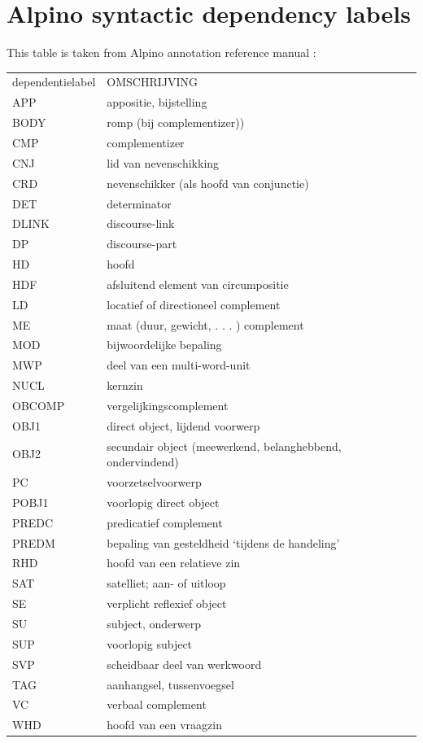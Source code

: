 \documentclass{book}
\begin{document}
\chapter{Alpino syntactic dependency labels} \label{app-dep}
This table is taken from Alpino annotation reference manual \cite{lassy2011} :

\begin{tabular}{ll}
dependentielabel & 	OMSCHRIJVING\\
APP & 	appositie, bijstelling\\
BODY & 	romp (bij complementizer))\\
CMP & 	complementizer\\
CNJ & 	lid van nevenschikking\\
CRD & 	nevenschikker (als hoofd van conjunctie)\\
DET & 	determinator\\
DLINK & 	discourse-link\\
DP & 	discourse-part\\
HD & 	hoofd\\
HDF & 	afsluitend element van circumpositie\\
LD & 	locatief of directioneel complement\\
ME & 	maat (duur, gewicht, . . . ) complement\\
MOD & 	bijwoordelijke bepaling\\
MWP & 	deel van een multi-word-unit\\
NUCL & 	kernzin\\
OBCOMP & 	vergelijkingscomplement\\
OBJ1 & 	direct object, lijdend voorwerp\\
OBJ2 & 	secundair object (meewerkend, belanghebbend, ondervindend)\\
PC & 	voorzetselvoorwerp\\
POBJ1 & 	voorlopig direct object\\
PREDC & 	predicatief complement\\
PREDM & 	bepaling van gesteldheid ‘tijdens de handeling’\\
RHD & 	hoofd van een relatieve zin\\
SAT & 	satelliet; aan- of uitloop\\
SE & 	verplicht reflexief object\\
SU & 	subject, onderwerp\\
SUP & 	voorlopig subject\\
SVP & 	scheidbaar deel van werkwoord\\
TAG & 	aanhangsel, tussenvoegsel\\
VC & 	verbaal complement\\
WHD & 	hoofd van een vraagzin\\
\end{tabular}


\end{document}

